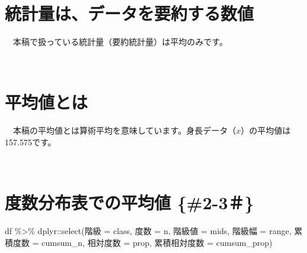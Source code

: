 \documentclass[
  12pt,
]{book}
\newenvironment{Shaded}{\begin{snugshade}}{\end{snugshade}}
\newcommand{\AttributeTok}[1]{\textcolor[rgb]{0.77,0.63,0.00}{#1}}
\newcommand{\FunctionTok}[1]{\textcolor[rgb]{0.00,0.00,0.00}{#1}}
\newcommand{\NormalTok}[1]{#1}
\newcommand{\OtherTok}[1]{\textcolor[rgb]{0.56,0.35,0.01}{#1}}
\newcommand{\SpecialCharTok}[1]{\textcolor[rgb]{0.00,0.00,0.00}{#1}}
\newcommand{\StringTok}[1]{\textcolor[rgb]{0.31,0.60,0.02}{#1}}
\begin{document}
　

\hypertarget{ux7d71ux8a08ux91cfux306fux30c7ux30fcux30bfux3092ux8981ux7d04ux3059ux308bux6570ux5024}{%
\section{統計量は、データを要約する数値}\label{ux7d71ux8a08ux91cfux306fux30c7ux30fcux30bfux3092ux8981ux7d04ux3059ux308bux6570ux5024}}

　本稿で扱っている統計量（要約統計量）は平均のみです。

　

\hypertarget{ux5e73ux5747ux5024ux3068ux306f}{%
\section{平均値とは}\label{ux5e73ux5747ux5024ux3068ux306f}}

　本稿の平均値とは算術平均を意味しています。身長データ（\(x\)）の平均値は157.575です。

　

\hypertarget{ux5ea6ux6570ux5206ux5e03ux8868ux3067ux306eux5e73ux5747ux5024-2-3}{%
\section{度数分布表での平均値 \{\#2-3＃\}}\label{ux5ea6ux6570ux5206ux5e03ux8868ux3067ux306eux5e73ux5747ux5024-2-3}}

\begin{Shaded}
\begin{Highlighting}[]
\NormalTok{df }\SpecialCharTok{\%\textgreater{}\%} 
\NormalTok{  dplyr}\SpecialCharTok{::}\FunctionTok{select}\NormalTok{(}\StringTok{\textasciigrave{}}\AttributeTok{階級}\StringTok{\textasciigrave{}} \OtherTok{=}\NormalTok{ class, }\StringTok{\textasciigrave{}}\AttributeTok{度数}\StringTok{\textasciigrave{}} \OtherTok{=}\NormalTok{ n, }\StringTok{\textasciigrave{}}\AttributeTok{階級値}\StringTok{\textasciigrave{}} \OtherTok{=}\NormalTok{ mids, }\StringTok{\textasciigrave{}}\AttributeTok{階級幅}\StringTok{\textasciigrave{}} \OtherTok{=}\NormalTok{ range,}
                \StringTok{\textasciigrave{}}\AttributeTok{累積度数}\StringTok{\textasciigrave{}} \OtherTok{=}\NormalTok{ cumsum\_n, }\StringTok{\textasciigrave{}}\AttributeTok{相対度数}\StringTok{\textasciigrave{}} \OtherTok{=}\NormalTok{ prop, }\StringTok{\textasciigrave{}}\AttributeTok{累積相対度数}\StringTok{\textasciigrave{}} \OtherTok{=}\NormalTok{ cumsum\_prop)}
\end{Highlighting}
\end{Shaded}
\end{document}
